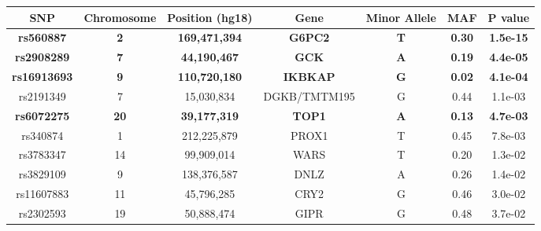 \begin{table}[ht]
\centering
{\tiny
\begin{tabular}{ccccccc}
  \hline
SNP & Chromosome & Position (hg18) & Gene & Minor Allele & MAF & P value \\ 
  \hline
\textcolor{maroon2}{\textbf{rs560887}} & \textcolor{maroon2}{\textbf{2}} & \textcolor{maroon2}{\textbf{169,471,394}} & \textcolor{maroon2}{\textbf{G6PC2}} & \textcolor{maroon2}{\textbf{T}} & \textcolor{maroon2}{\textbf{0.30}} & \textcolor{maroon2}{\textbf{1.5e-15}} \\ 
  \textcolor{maroon2}{\textbf{rs2908289}} & \textcolor{maroon2}{\textbf{7}} & \textcolor{maroon2}{\textbf{ 44,190,467}} & \textcolor{maroon2}{\textbf{GCK}} & \textcolor{maroon2}{\textbf{A}} & \textcolor{maroon2}{\textbf{0.19}} & \textcolor{maroon2}{\textbf{4.4e-05}} \\ 
  \textcolor{maroon2}{\textbf{rs16913693}} & \textcolor{maroon2}{\textbf{9}} & \textcolor{maroon2}{\textbf{110,720,180}} & \textcolor{maroon2}{\textbf{IKBKAP}} & \textcolor{maroon2}{\textbf{G}} & \textcolor{maroon2}{\textbf{0.02}} & \textcolor{maroon2}{\textbf{4.1e-04}} \\ 
  rs2191349 & 7 &  15,030,834 & DGKB/TMTM195 & G & 0.44 & 1.1e-03 \\ 
  \textcolor{maroon2}{\textbf{rs6072275}} & \textcolor{maroon2}{\textbf{20}} & \textcolor{maroon2}{\textbf{ 39,177,319}} & \textcolor{maroon2}{\textbf{TOP1}} & \textcolor{maroon2}{\textbf{A}} & \textcolor{maroon2}{\textbf{0.13}} & \textcolor{maroon2}{\textbf{4.7e-03}} \\ 
  rs340874 & 1 & 212,225,879 & PROX1 & T & 0.45 & 7.8e-03 \\ 
  rs3783347 & 14 &  99,909,014 & WARS & T & 0.20 & 1.3e-02 \\ 
  rs3829109 & 9 & 138,376,587 & DNLZ & A & 0.26 & 1.4e-02 \\ 
  rs11607883 & 11 &  45,796,285 & CRY2 & G & 0.46 & 3.0e-02 \\ 
  rs2302593 & 19 &  50,888,474 & GIPR & G & 0.48 & 3.7e-02 \\ 
   \hline
\end{tabular}
}
\end{table}
